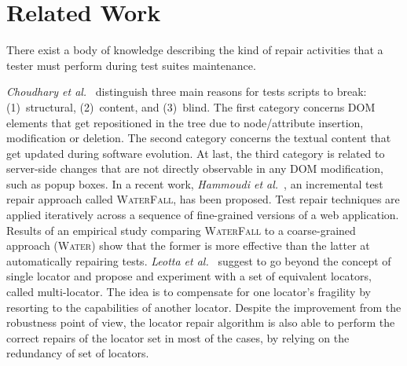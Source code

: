 \section{Related Work}\label{sec:relwork}



There exist a body of knowledge describing the kind of repair activities that a tester must perform during test suites maintenance. 

 \textit{Choudhary et al.}~\cite{Choudhary:2011:WWA:2002931.2002935} distinguish three main reasons for tests scripts to break: (1)~structural, (2)~content, and (3)~blind. The first category concerns DOM elements that get repositioned in the tree due to node/attribute insertion, modification or deletion. The second category concerns the textual content that get updated during software evolution. At last, the third category is related to server-side changes that are not directly observable in any DOM modification, such as popup boxes. 
%
In a recent work, \textit{Hammoudi et al.}~\cite{Hammoudi-2016-FSE}, an incremental test repair approach called \textsc{WaterFall}, has been proposed. Test repair techniques are applied iteratively across a sequence of fine-grained versions of a web application. Results of an empirical study comparing \textsc{WaterFall} to a coarse-grained approach (\textsc{Water}) show that the former is more effective than the latter at automatically repairing tests.
%
\textit{Leotta et al.}~\cite{2015-leotta-ICST} suggest to go beyond the concept of single locator and propose and experiment with a set of equivalent locators, called multi-locator. 
The idea is to compensate for one locator's fragility by resorting to the capabilities of another locator. Despite the improvement from the robustness point of view, the locator repair algorithm is also able to perform the correct repairs of the locator set in most of the cases, by relying on the redundancy of set of locators.

